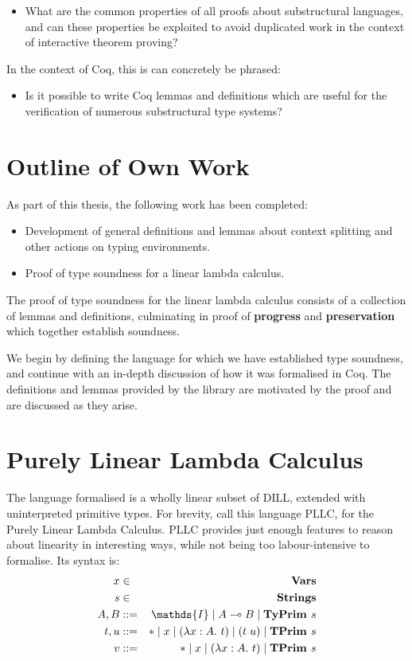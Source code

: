 \documentclass[]{unswthesis}
\newcommand{\lam}[1]{\lambda #1 \ldotp \,}
\newcommand{\app}[2]{(#1 \; #2)}
\newcommand{\lolly}{\multimap}
\newcommand{\sor}{\; | \;}
\newcommand{\TyPrim}[1]{\b{TyPrim } #1}
\newcommand{\TPrim}[1]{\b{TPrim } #1}
\let\b\textbf
\begin{document}
\begin{itemize}
\item What are the common properties of all proofs about substructural languages, and can these properties be exploited to avoid duplicated work in the context of interactive theorem proving?
\end{itemize}

In the context of Coq, this is can concretely be phrased:

\begin{itemize}
\item Is it possible to write Coq lemmas and definitions which are useful for the verification of numerous substructural type systems?
\end{itemize}

\section{Outline of Own Work}

As part of this thesis, the following work has been completed:

\begin{itemize}
\item Development of general definitions and lemmas about context splitting and other actions on typing environments.
\item Proof of type soundness for a linear lambda calculus.
\end{itemize}

The proof of type soundness for the linear lambda calculus consists of a collection of lemmas and definitions, culminating in proof of \b{progress} and \b{preservation} which together establish soundness.

We begin by defining the language for which we have established type soundness, and continue with an in-depth discussion of how it was formalised in Coq. The definitions and lemmas provided by the library are motivated by the proof and are discussed as they arise.

\section{Purely Linear Lambda Calculus}

The language formalised is a wholly linear subset of DILL, extended with uninterpreted primitive types. For brevity, call this language PLLC, for the Purely Linear Lambda Calculus. PLLC provides just enough features to reason about linearity in interesting ways, while not being too labour-intensive to formalise. Its syntax is:
\begin{eqnarray*}
x & \in & \b{Vars} \\
s & \in & \b{Strings} \\
A,B & ::= & \mathds{I} \sor A \lolly B \sor \TyPrim{s} \\
t,u & ::= & * \sor x \sor (\lam{x : A} t) \sor \app{t}{u} \sor \TPrim{s} \\
v & ::= & * \sor x \sor (\lam{x : A} t) \sor \TPrim{s}
\end{eqnarray*}
\end{document}
